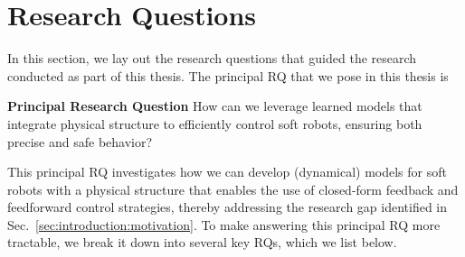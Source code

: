 \section{Research Questions}\label{sec:introduction:research_questions}
In this section, we lay out the research questions that guided the research conducted as part of this thesis.
The principal \gls{RQ} that we pose in this thesis is
\begin{titled-frame}{\textbf{Principal Research Question}}
    \noindent How can we leverage learned models that integrate physical structure to efficiently control soft robots, ensuring both precise and safe behavior?
\end{titled-frame}
This principal \gls{RQ} investigates how we can develop (dynamical) models for soft robots with a physical structure that enables the use of closed-form feedback and feedforward control strategies, thereby addressing the research gap identified in Sec.~\ref{sec:introduction:motivation}. To make answering this principal \gls{RQ} more tractable, we break it down into several key \glspl{RQ}, which we list below.

